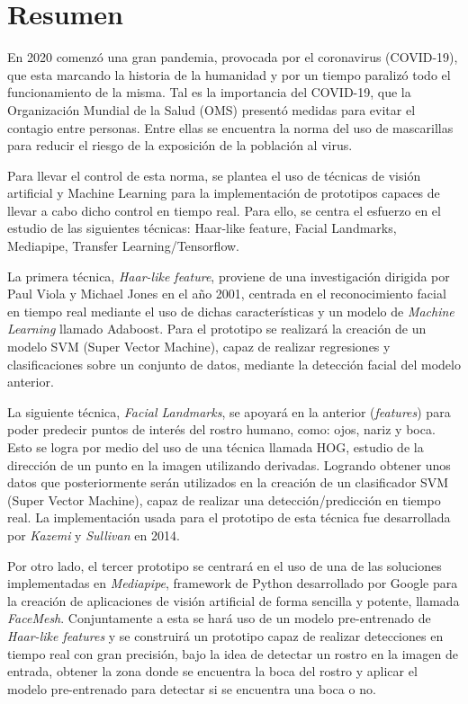 
\chapter*{Resumen}

En 2020 comenzó una gran pandemia, provocada por el coronavirus (COVID-19), que esta marcando la historia de la humanidad y por un tiempo paralizó todo el funcionamiento de la misma. Tal es la importancia del COVID-19, que la Organización Mundial de la Salud (OMS) presentó medidas para evitar el contagio entre personas. Entre ellas se encuentra la norma del uso de mascarillas para reducir el riesgo de la exposición de la población al virus. 

Para llevar el control de esta norma, se plantea el uso de técnicas de visión artificial y Machine Learning para la implementación de prototipos capaces de llevar a cabo dicho control en tiempo real. Para ello, se centra el esfuerzo en el estudio de las siguientes técnicas: Haar-like feature, Facial Landmarks, Mediapipe, Transfer Learning/Tensorflow. 

La primera técnica, \textit{Haar-like feature}, proviene de una investigación dirigida por Paul Viola y Michael Jones en el año 2001, centrada en el reconocimiento facial en tiempo real mediante el uso de dichas características y un modelo de \textit{Machine Learning} llamado Adaboost. Para el prototipo se realizará la creación de un modelo SVM (Super Vector Machine), capaz de realizar regresiones y clasificaciones sobre un conjunto de datos, mediante la detección facial del modelo anterior.

La siguiente técnica, \textit{Facial Landmarks}, se apoyará en la anterior (\textit{features}) para poder predecir puntos de interés del rostro humano, como: ojos, nariz y boca. Esto se logra por medio del uso de una técnica llamada HOG, estudio de la dirección de un punto en la imagen utilizando derivadas. Logrando obtener unos datos que posteriormente serán utilizados en la creación de un clasificador SVM (Super Vector Machine), capaz de realizar una detección/predicción en tiempo real. La implementación usada para el prototipo de esta técnica fue desarrollada por \textit{Kazemi} y \textit{Sullivan} en 2014.

Por otro lado, el tercer prototipo se centrará en el uso de una de las soluciones implementadas en \textit{Mediapipe}, framework de Python desarrollado por Google para la creación de aplicaciones de visión artificial de forma sencilla y potente, llamada \textit{FaceMesh}. Conjuntamente a esta se hará uso de un modelo pre-entrenado de \textit{Haar-like features} y se construirá un prototipo capaz de realizar detecciones en tiempo real con gran precisión, bajo la idea de detectar un rostro en la imagen de entrada, obtener la zona donde se encuentra la boca del rostro y aplicar el modelo pre-entrenado para detectar si se encuentra una boca o no.

